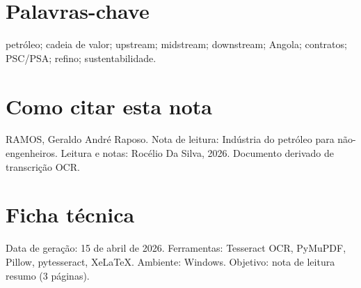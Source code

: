 \documentclass[12pt,a4paper]{article}
\begin{document}
\section*{Palavras-chave}
\noindent petróleo; cadeia de valor; upstream; midstream; downstream; Angola; contratos; PSC/PSA; refino; sustentabilidade.

\section*{Como citar esta nota}
\noindent RAMOS, Geraldo André Raposo. Nota de leitura: Indústria do petróleo para não-engenheiros. Leitura e notas: Rocélio Da Silva, 2026. Documento derivado de transcrição OCR.
\section*{Ficha técnica}
\noindent Data de geração: 15 de abril de 2026. Ferramentas: Tesseract OCR, PyMuPDF, Pillow, pytesseract, XeLaTeX. Ambiente: Windows. Objetivo: nota de leitura resumo (3 páginas).
\end{document}
